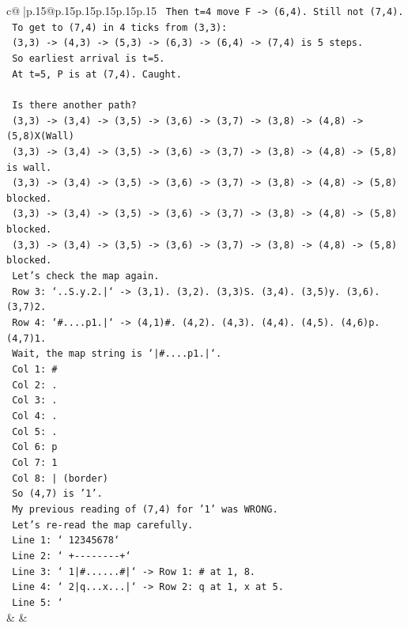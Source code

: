 \documentclass{article}
\begin{document}
{\begin{supertabular}{c@{$\;$}|p{.15\linewidth}@{}p{.15\linewidth}p{.15\linewidth}p{.15\linewidth}p{.15\linewidth}p{.15\linewidth}}
{{{\texttt{   Then t=4 move F {-}> (6,4). Still not (7,4).} \\
\texttt{   To get to (7,4) in 4 ticks from (3,3):} \\
\texttt{   (3,3) {-}> (4,3) {-}> (5,3) {-}> (6,3) {-}> (6,4) {-}> (7,4) is 5 steps.} \\
\texttt{   So earliest arrival is t=5.} \\
\texttt{   At t=5, P is at (7,4). Caught.} \\
\\ 
\texttt{   Is there another path?} \\
\texttt{   (3,3) {-}> (3,4) {-}> (3,5) {-}> (3,6) {-}> (3,7) {-}> (3,8) {-}> (4,8) {-}> (5,8)X(Wall)} \\
\texttt{   (3,3) {-}> (3,4) {-}> (3,5) {-}> (3,6) {-}> (3,7) {-}> (3,8) {-}> (4,8) {-}> (5,8) is wall.} \\
\texttt{   (3,3) {-}> (3,4) {-}> (3,5) {-}> (3,6) {-}> (3,7) {-}> (3,8) {-}> (4,8) {-}> (5,8) blocked.} \\
\texttt{   (3,3) {-}> (3,4) {-}> (3,5) {-}> (3,6) {-}> (3,7) {-}> (3,8) {-}> (4,8) {-}> (5,8) blocked.} \\
\texttt{   (3,3) {-}> (3,4) {-}> (3,5) {-}> (3,6) {-}> (3,7) {-}> (3,8) {-}> (4,8) {-}> (5,8) blocked.} \\
\texttt{   Let's check the map again.} \\
\texttt{   Row 3: `..S.y.2.|` {-}> (3,1). (3,2). (3,3)S. (3,4). (3,5)y. (3,6). (3,7)2.} \\
\texttt{   Row 4: `\#....p1.|` {-}> (4,1)\#. (4,2). (4,3). (4,4). (4,5). (4,6)p. (4,7)1.} \\
\texttt{   Wait, the map string is `|\#....p1.|`.} \\
\texttt{   Col 1: \#} \\
\texttt{   Col 2: .} \\
\texttt{   Col 3: .} \\
\texttt{   Col 4: .} \\
\texttt{   Col 5: .} \\
\texttt{   Col 6: p} \\
\texttt{   Col 7: 1} \\
\texttt{   Col 8: | (border)} \\
\texttt{   So (4,7) is '1'.} \\
\texttt{   My previous reading of (7,4) for '1' was WRONG.} \\
\texttt{   Let's re{-}read the map carefully.} \\
\texttt{   Line 1: ` 12345678`} \\
\texttt{   Line 2: `  +{-}{-}{-}{-}{-}{-}{-}{-}+`} \\
\texttt{   Line 3: ` 1|\#......\#|` {-}> Row 1: \# at 1, 8.} \\
\texttt{   Line 4: ` 2|q...x...|` {-}> Row 2: q at 1, x at 5.} \\
\texttt{   Line 5: `} \\
            }
        }
    }
    & & \\ \\


\end{supertabular}}
\end{document}

